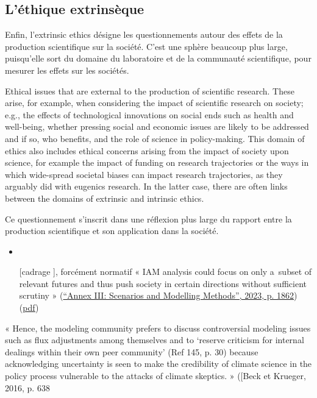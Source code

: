 \subsection{L'éthique extrinsèque}

Enfin, l'\Gls{extrinsic ethics} désigne les questionnements autour des effets de la production scientifique sur la société. C'est une sphère beaucoup plus large, puisqu'elle sort du domaine du laboratoire et de la communauté scientifique, pour mesurer les effets sur les sociétés. 

\begin{displayquote}
Ethical issues that are external to the production of scientific research. These arise, for example, when considering the impact of scientific research on society; e.g., the effects of technological innovations on social ends such as health and well-being, whether pressing social and economic issues are likely to be addressed and if so, who benefits, and the role of science in policy-making. This domain of ethics also includes ethical concerns arising from the impact of society upon science, for example the impact of funding on research trajectories or the ways in which wide-spread societal biases can impact research trajectories, as they arguably did with eugenics research. In the latter case, there are often links between the domains of extrinsic and intrinsic ethics.
\end{displayquote}
Ce questionnement s'inscrit dans une réflexion plus large du rapport entre la production scientifique et son application dans la société. 

\begin{tcolorbox}
\begin{itemize}
    \item 
    \item [[cadrage]], forcément normatif « IAM analysis could focus on only a subset of relevant futures and thus push society in certain directions without sufficient scrutiny » (\href{zotero://select/library/items/2SDDNUUF}{“Annex III: Scenarios and Modelling Methods”, 2023, p. 1862}) (\href{zotero://open-pdf/library/items/CHVFSLLH?page=22&annotation=4MBM5B9Q}{pdf})

\end{itemize}

\end{tcolorbox}


\begin{displayquote}
    « Hence, the modeling community prefers to discuss controversial modeling issues such as flux adjustments among themselves and to ‘reserve criticism for internal dealings within their own peer community’ (Ref 145, p. 30) because acknowledging uncertainty is seen to make the credibility of climate science in the policy process vulnerable to the attacks of climate skeptics. » ([Beck et Krueger, 2016, p. 638
\end{displayquote}

